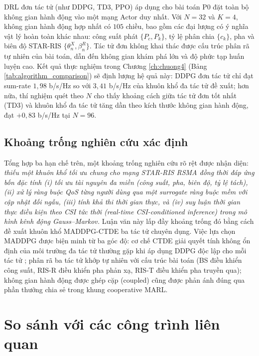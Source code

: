 DRL đơn tác tử (như DDPG, TD3, PPO) áp dụng cho bài toán P0 đặt toàn
bộ không gian hành động vào một mạng Actor duy nhất. Với $N=32$ và
$K=4$, không gian hành động hợp nhất có $105$ chiều, bao gồm các đại
lượng có ý nghĩa vật lý hoàn toàn khác nhau: công suất phát $\{P_c,
P_k\}$, tỷ lệ phân chia $\{c_k\}$, pha và biên độ STAR-RIS $\{\theta_n^X,
\beta_n^R\}$. Tác tử đơn không khai thác được cấu trúc phân rã tự nhiên
của bài toán, dẫn đến không gian khám phá lớn và độ phức tạp huấn luyện
cao. Kết quả thực nghiệm trong Chương \ref{ch:chuong4} (Bảng
\ref{tab:algorithm_comparison}) sẽ định lượng hệ quả này: DDPG đơn tác
tử chỉ đạt sum-rate $1{,}98$ b/s/Hz so với $3{,}41$ b/s/Hz của khuôn
khổ đa tác tử đề xuất; hơn nữa, thí nghiệm quét theo $N$ cho thấy
khoảng cách giữa tác tử đơn tốt nhất (TD3) và khuôn khổ đa tác tử
tăng dần theo kích thước không gian hành động, đạt $+0{,}83$ b/s/Hz
tại $N=96$.

\subsection{Khoảng trống nghiên cứu xác định}

Tổng hợp ba hạn chế trên, một khoảng trống nghiên cứu rõ rệt được nhận
diện: \emph{thiếu một khuôn khổ tối ưu chung cho mạng STAR-RIS RSMA
đồng thời đáp ứng bốn đặc tính (i) tối ưu tài nguyên đa miền (công suất,
pha, biên độ, tỷ lệ tách), (ii) xử lý ràng buộc QoS từng người dùng qua
một surrogate ràng buộc mềm với cập nhật đối ngẫu, (iii)
tính khả thi thời gian thực, và (iv) suy luận thời gian thực điều kiện
theo CSI tức thời (real-time CSI-conditioned inference) trong mô hình
kênh động Gauss--Markov.} Luận văn này lấp đầy khoảng trống đó bằng cách
đề xuất khuôn khổ MADDPG-CTDE ba tác tử chuyên dụng. Việc lựa chọn
MADDPG được biện minh từ ba góc độ: cơ chế CTDE giải quyết tính không
ổn định của môi trường đa tác tử thường gặp khi áp dụng DDPG độc lập
cho mỗi tác tử \cite{lowe2017multi}; phân rã ba tác tử khớp tự nhiên
với cấu trúc bài toán (BS điều khiển công suất, RIS-R điều khiển pha
phản xạ, RIS-T điều khiển pha truyền qua); không gian hành động được
ghép cặp (coupled) cũng được phản ánh đúng qua phần thưởng chia sẻ
trong khung cooperative MARL.

\section{So sánh với các công trình liên quan}
\label{sec:related_work}

